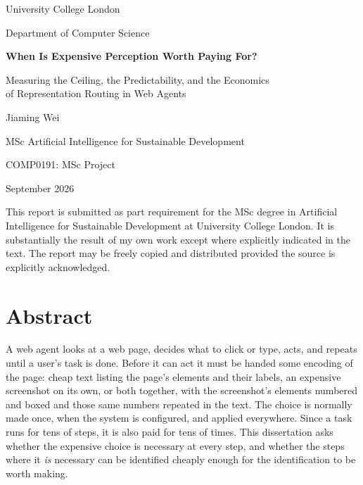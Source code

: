 
\begin{titlepage}
\centering
\vspace*{1.2cm}
{\Large University College London\par}
\vspace{0.3cm}
{\large Department of Computer Science\par}
\vfill
{\LARGE\bfseries When Is Expensive Perception Worth Paying For?\par}
\vspace{0.5cm}
{\large Measuring the Ceiling, the Predictability, and the Economics\\
of Representation Routing in Web Agents\par}
\vfill
{\large Jiaming Wei\par}
\vspace{0.4cm}
{\normalsize MSc Artificial Intelligence for Sustainable Development\par}
{\normalsize COMP0191: MSc Project\par}
\vfill
{\normalsize September 2026\par}
\vspace{0.8cm}
{\footnotesize
This report is submitted as part requirement for the MSc degree in Artificial
Intelligence for Sustainable Development at University College London. It is
substantially the result of my own work except where explicitly indicated in
the text. The report may be freely copied and distributed provided the source
is explicitly acknowledged.\par}
\end{titlepage}

\chapter*{Abstract}

A web agent looks at a web page, decides what to click or type, acts, and
repeats until a user's task is done. Before it can act it must be handed some
encoding of the page: cheap text listing the page's elements and their labels,
an expensive screenshot on its own, or both together, with the screenshot's
elements numbered and boxed and those same numbers repeated in the text. The choice is normally made once, when the system is configured,
and applied everywhere. Since a task runs for tens of steps, it is also paid for
tens of times. This dissertation asks whether the expensive choice is necessary
at every step, and whether the steps where it \emph{is} necessary can be
identified cheaply enough for the identification to be worth making.

